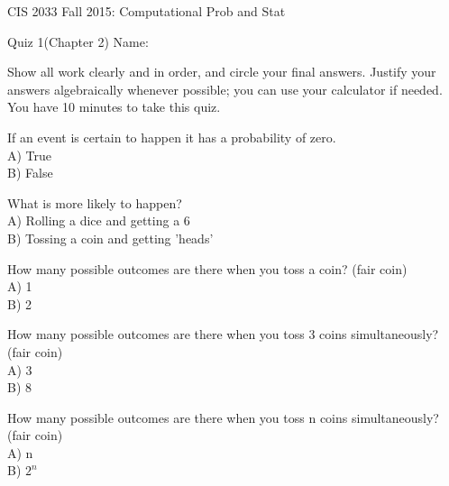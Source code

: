 \documentclass[11pt,epsfig]{article}
\begin{document}
CIS 2033 Fall 2015: Computational Prob and Stat

Quiz 1(Chapter 2) \hspace{2.0in} {Name:} {\underline {\hspace{2.0in}}}
\vspace{2pc}

Show all work clearly and in order, and circle your final answers.  
Justify your answers algebraically whenever possible; you can use 
your calculator if needed.  You have 10 minutes to take this quiz.
\vspace{2pc}

\begin{problem}{1}  If an event is certain to happen it has a probability of zero. \\
\hspace{0.5in} A) True \\
\hspace{0.5in} B) False
\end{problem}

\begin{problem}{10} What is more likely to happen? \\
\hspace{0.5in} A) Rolling a dice and getting a 6 \\
\hspace{0.5in} B) Tossing a coin and getting 'heads'
\end{problem}

\begin{problem}{10} How many possible outcomes are there when you toss a coin?  (fair coin)\\
\hspace{0.5in} A) 1 \\
\hspace{0.5in} B) 2
\end{problem}

\begin{problem}{10} How many possible outcomes are there when you toss 3 coins simultaneously? (fair coin)\\
\hspace{0.5in} A) 3 \\
\hspace{0.5in} B) 8
\end{problem}

\begin{problem}{10} How many possible outcomes are there when you toss n coins simultaneously? (fair coin)\\
\hspace{0.5in} A) n\\
\hspace{0.5in} B) $2^n$
\end{problem}
\end{document}
